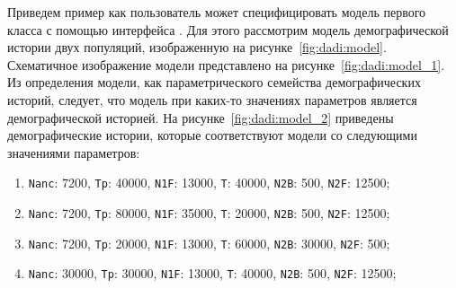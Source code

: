 Приведем пример как пользователь может специфицировать модель первого класса с помощью интерфейса \dadi.
Для этого рассмотрим модель демографической истории двух популяций, изображенную на рисунке~\ref{fig:dadi:model}.
Схематичное изображение модели представлено на рисунке~\ref{fig:dadi:model_1}.
Из определения модели, как параметрического семейства демографических историй, следует, что модель при каких-то значениях параметров является демографической историей.
На рисунке~\ref{fig:dadi:model_2} приведены демографические истории, которые соответствуют модели со следующими значениями параметров:
\begin{enumerate}[label={\arabic*}.]
    \item \texttt{Nanc}: 7200, \texttt{Tp}: 40000, \texttt{N1F}: 13000, \texttt{T}: 40000, \texttt{N2B}: 500, \texttt{N2F}: 12500;
    \item \texttt{Nanc}: 7200, \texttt{Tp}: 80000, \texttt{N1F}: 35000, \texttt{T}: 20000, \texttt{N2B}: 500, \texttt{N2F}: 12500;
    \item \texttt{Nanc}: 7200, \texttt{Tp}: 20000, \texttt{N1F}: 13000, \texttt{T}: 60000, \texttt{N2B}: 30000, \texttt{N2F}: 500;
    \item \texttt{Nanc}: 30000, \texttt{Tp}: 30000, \texttt{N1F}: 13000, \texttt{T}: 40000, \texttt{N2B}: 500, \texttt{N2F}: 12500;
\end{enumerate}

